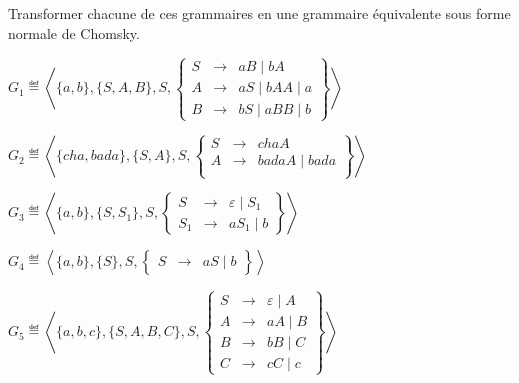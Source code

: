 
\begingroup

\begin{exercice}\label{exo:parsing/CYK/revision}

  Transformer chacune de ces grammaires en une grammaire équivalente
  sous forme normale de Chomsky.
  \begin{questions}
  \item $G_1  \eqdef \left\langle\{a, b\}, \{S, A, B\}, S,
    \left\{\begin{array}{lll}
    S   &\rightarrow& aB \mid  bA \\
    A   &\rightarrow& aS \mid  bAA \mid  a \\
    B   &\rightarrow& bS \mid  aBB \mid  b 
    \end{array}\right\}\right\rangle$
  \item $G_2 \eqdef \left\langle\{cha, bada\}, \{S, A\}, S,
    \left\{\begin{array}{lll}
    S   &\rightarrow& cha A \\
    A   &\rightarrow& badaA \mid  bada \\
    \end{array}\right\}\right\rangle$
  \item $G_3 \eqdef \left\langle\{a, b\}, \{S, S_1\}, S,
    \left\{\begin{array}{lll}
    S   &\rightarrow& \varepsilon \mid  S_1 \\
    S_1 &\rightarrow& aS_1 \mid  b
    \end{array}\right\}\right\rangle$ 
  \item $G_4 \eqdef \left\langle\{a, b\}, \{S\}, S,
    \left\{\begin{array}{lll}
    S   &\rightarrow& aS \mid  b
    \end{array}\right\}\right\rangle$ 
  \item $G_5 \eqdef \left\langle\{a, b,c \}, \{S, A, B, C\}, S,
    \left\{\begin{array}{lll}
    S   &\rightarrow& \varepsilon \mid  A \\
    A   &\rightarrow& aA \mid  B \\
    B   &\rightarrow& bB \mid  C \\
    C   &\rightarrow& cC \mid  c
    \end{array}\right\}\right\rangle$
  \end{questions}

\end{exercice}

